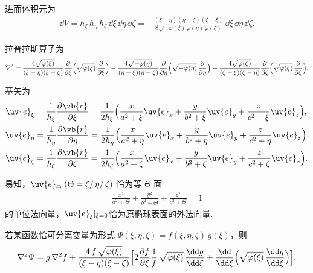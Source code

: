 进而体积元为
\begin{align*}
	\dd V
	=h_{\xi}\,h_{\eta}\,h_{\zeta}\,\dd \xi\, \dd \eta\, \dd \zeta=-\frac{(\xi-\eta)(\eta-\zeta)(\zeta-\xi)}
	{8\sqrt{-\varphi(\xi)\,\varphi(\eta)\,\varphi(\zeta)}}\,
	\dd \xi\,\dd \eta\,\dd \zeta.
\end{align*}

拉普拉斯算子为
\begin{align*}
	\nabla^{2}
	=\frac{4\sqrt{\varphi(\xi)}}{(\xi-\eta)(\xi-\zeta)}
	\frac{\partial}{\partial\xi}\Bigl(\sqrt{\varphi(\xi)}\,
	\frac{\partial}{\partial\xi}\Bigr)\nonumber
	-\frac{4\sqrt{-\varphi(\eta)}}{(\eta-\xi)(\eta-\zeta)}
	\frac{\partial}{\partial\eta}\Bigl(\sqrt{-\varphi(\eta)}\,
	\frac{\partial}{\partial\eta}\Bigr)\nonumber
	+\frac{4\sqrt{\varphi(\zeta)}}{(\zeta-\xi)(\zeta-\eta)}
	\frac{\partial}{\partial\zeta}\Bigl(\sqrt{\varphi(\zeta)}\,
	\frac{\partial}{\partial\zeta}\Bigr).
\end{align*}

基矢为
\begin{align*}
	\uv{e}_{\xi}
	 & =\frac{1}{h_{\xi}}\frac{\partial\vb{r}}{\partial\xi}
	=\frac{1}{2h_{\xi}}\Bigl(\frac{x}{a^{2}+\xi}\uv{e}_{x}
	+\frac{y}{b^{2}+\xi}\uv{e}_{y}
	+\frac{z}{c^{2}+\xi}\uv{e}_{z}\Bigr),\notag                 \\
	\uv{e}_{\eta}
	 & =\frac{1}{h_{\eta}}\frac{\partial\vb{r}}{\partial\eta}
	=\frac{1}{2h_{\eta}}\Bigl(\frac{x}{a^{2}+\eta}\uv{e}_{x}
	+\frac{y}{b^{2}+\eta}\uv{e}_{y}
	+\frac{z}{c^{2}+\eta}\uv{e}_{z}\Bigr),\notag                \\
	\uv{e}_{\zeta}
	 & =\frac{1}{h_{\zeta}}\frac{\partial\vb{r}}{\partial\zeta}
	=\frac{1}{2h_{\zeta}}\Bigl(\frac{x}{a^{2}+\zeta}\uv{e}_{x}
	+\frac{y}{b^{2}+\zeta}\uv{e}_{y}
	+\frac{z}{c^{2}+\zeta}\uv{e}_{z}\Bigr).
\end{align*}

易知，\(\uv{e}_{\Theta}\;(\Theta=\xi/\,\eta/\,\zeta)\) 恰为等 \(\Theta\) 面
\begin{align*}
	\frac{x^{2}}{a^{2}+\Theta}+\frac{y^{2}}{b^{2}+\Theta}+\frac{z^{2}}{c^{2}+\Theta}=1
\end{align*}
的单位法向量，\(\uv{e}_{\xi}|_{\xi=0}\)恰为原椭球表面的外法向量.

若某函数恰可分离变量为形式
\(\Psi(\xi,\eta,\zeta)=f(\xi,\eta,\zeta)\,g(\xi)\)，则
\begin{align*}
	\nabla^{2}\Psi
	=g\,\nabla^{2}f
	+\frac{4\,f\,\sqrt{\varphi(\xi)}}{(\xi-\eta)(\xi-\zeta)}
	\Bigl[
		2\frac{\partial f}{\partial\xi}\frac{1}{f}\,
		\sqrt{\varphi(\xi)}\,\frac{\dd g}{\dd \xi}
		+\frac{\dd}{\dd \xi}\Bigl(\sqrt{\varphi(\xi)}\,\frac{\dd g}{\dd \xi}\Bigr)
		\Bigr].
\end{align*}